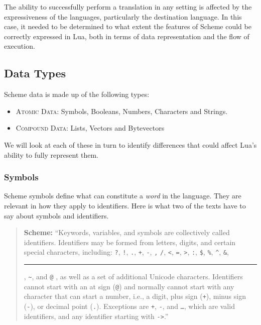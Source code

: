 The ability to successfully perform a translation in any setting is affected by
the expressiveness of the languages, particularly the destination language. In
this case, it needed to be determined to what extent the features of Scheme
could be correctly expressed in Lua, both in terms of data representation and
the flow of execution.

\subsection{Data Types}

Scheme data is made up of the following
types:~\cite[Appendix~(Formal~Syntax)]{tspl}
\begin{itemize}
\item \textsc{Atomic Data}: Symbols, Booleans, Numbers, Characters and Strings.
\item \textsc{Compound Data}: Lists, Vectors and Bytevectors
\end{itemize}

We will look at each of these in turn to identify differences that could affect
Lua's ability to fully represent them.

\subsubsection{Symbols}

Scheme symbols define what can constitute a \emph{word} in the language. They
are relevant in how they apply to identifiers. Here is what two of the texts
have to say about symbols and identifiers.

\begin{quotation}\textbf{Scheme:}
``Keywords, variables, and symbols are collectively called identifiers.
Identifiers may be formed from letters, digits, and certain special characters,
including: \texttt ?, \texttt !, \texttt ., \texttt +, \texttt -, \texttt *,
\texttt /, \texttt <, \texttt =, \texttt >, \texttt :, \texttt \$, \texttt \%,
\texttt \^{}, \texttt \&, \rule{3mm}{0.2mm}, \texttt \~{}, and \texttt @ , as
well as a set of additional Unicode characters.  Identifiers cannot start with
an at sign (\texttt @) and normally cannot start with any character that can
start a number, i.e., a digit, plus sign (\texttt +), minus sign (\texttt -), or
decimal point (\texttt .). Exceptions are \texttt +, \texttt -, and \texttt
\ldots, which are valid identifiers, and any identifier starting with
\texttt{->}.''~\cite[Sec~1.1]{tspl}
\end{quotation}

